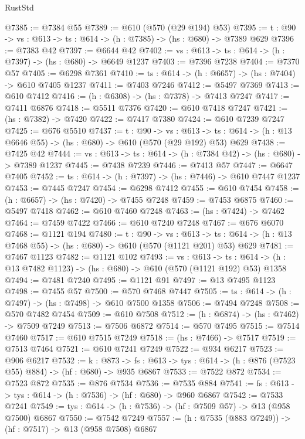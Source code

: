 \begin{lexlean}{RustStd}
\begin{coremodule}
@7385 := @7384 @55
@7389 := @610 (@570 (@29 @194) @53)
@7395 := {t : @90} -> {vs : @613} -> {ts : @614} -> (h : @7385) -> (hs : @680) -> @7389 @629
@7396 := @7383 @42
@7397 := @6644 @42
@7402 := {vs : @613} -> {ts : @614} -> (h : @7397) -> (hs : @680) -> @6649 @1237
@7403 := @7396 @7238
@7404 := @7370 @57
@7405 := @6298 @7361
@7410 := {ts : @614} -> (h : @6657) -> (hs : @7404) -> @610 @7405 @1237
@7411 := @7403 @7246
@7412 := @5497 @7369
@7413 := @610 @7412
@7416 := (h : @6308) -> (hs : @7378) -> @7413 @7247
@7417 := @7411 @6876
@7418 := @5511 @7376
@7420 := @610 @7418 @7247
@7421 := (hs : @7382) -> @7420
@7422 := @7417 @7380
@7424 := @610 @7239 @7247
@7425 := @676 @5510
@7437 := {t : @90} ->
  {vs : @613} ->
  {ts : @614} -> (h : @13 @6646 @55) -> (hs : @680) -> @610 (@570 (@29 @192) @53) @629
@7438 := @7425 @42
@7444 := {vs : @613} -> {ts : @614} -> (h : @7384 @42) -> (hs : @680) -> @7389 @1237
@7445 := @7438 @7239
@7446 := @7413 @57
@7447 := @6647 @7405
@7452 := {ts : @614} -> (h : @7397) -> (hs : @7446) -> @610 @7447 @1237
@7453 := @7445 @7247
@7454 := @6298 @7412
@7455 := @610 @7454
@7458 := (h : @6657) -> (hs : @7420) -> @7455 @7248
@7459 := @7453 @6875
@7460 := @5497 @7418
@7462 := @610 @7460 @7248
@7463 := (hs : @7424) -> @7462
@7464 := @7459 @7422
@7466 := @610 @7240 @7248
@7467 := @676 @6070
@7468 := @1121 @194
@7480 := {t : @90} ->
  {vs : @613} ->
  {ts : @614} -> (h : @13 @7468 @55) -> (hs : @680) -> @610 (@570 (@1121 @201) @53) @629
@7481 := @7467 @1123
@7482 := @1121 @102
@7493 := {vs : @613} ->
  {ts : @614} -> (h : @13 @7482 @1123) -> (hs : @680) -> @610 (@570 (@1121 @192) @53) @1358
@7494 := @7481 @7240
@7495 := @1121 @91
@7497 := @13 @7495 @1123
@7498 := @7455 @57
@7500 := @570 @7468 @7447
@7505 := {ts : @614} -> (h : @7497) -> (hs : @7498) -> @610 @7500 @1358
@7506 := @7494 @7248
@7508 := @570 @7482 @7454
@7509 := @610 @7508
@7512 := (h : @6874) -> (hs : @7462) -> @7509 @7249
@7513 := @7506 @6872
@7514 := @570 @7495
@7515 := @7514 @7460
@7517 := @610 @7515 @7249
@7518 := (hs : @7466) -> @7517
@7519 := @7513 @7464
@7521 := @610 @7241 @7249
@7522 := @934 @6217
@7523 := @906 @6217
@7532 := {k : @873} ->
  {fs : @613} -> {tys : @614} -> (h : @876 (@7523 @55) @884) -> (hf : @680) -> @935 @6867
@7533 := @7522 @872
@7534 := @7523 @872
@7535 := @876 @7534
@7536 := @7535 @884
@7541 := {fs : @613} -> {tys : @614} -> (h : @7536) -> (hf : @680) -> @960 @6867
@7542 := @7533 @7241
@7549 := {tys : @614} -> (h : @7536) -> (hf : @7509 @57) -> @13 (@958 @7500) @6867
@7550 := @7542 @7249
@7557 := (h : @7535 (@883 @7249)) -> (hf : @7517) -> @13 (@958 @7508) @6867

\end{coremodule}
\end{lexlean}
